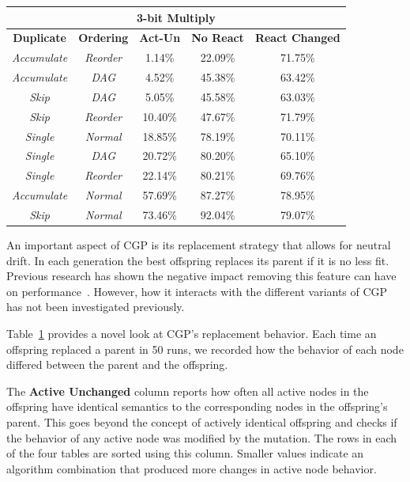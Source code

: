 \documentclass[journal]{IEEEtran}
\begin{document}
\begin{table}
\begin{tabular}{|c|c|c|c|c|}
  \multicolumn{5}{|c|}{\textbf{3-bit Multiply}} \\ \hline

\textbf{Duplicate} & \textbf{Ordering} & \textbf{Act-Un} & \textbf{No React} & \textbf{React Changed} \\ \hline
 \emph{Accumulate} & \emph{Reorder} & 1.14\% & 22.09\% & 71.75\% \\ \hline
 \emph{Accumulate} &     \emph{DAG} & 4.52\% & 45.38\% & 63.42\% \\ \hline
       \emph{Skip} &     \emph{DAG} & 5.05\% & 45.58\% & 63.03\% \\ \hline
       \emph{Skip} & \emph{Reorder} & 10.40\% & 47.67\% & 71.79\% \\ \hline
     \emph{Single} &  \emph{Normal} & 18.85\% & 78.19\% & 70.11\% \\ \hline
     \emph{Single} &     \emph{DAG} & 20.72\% & 80.20\% & 65.10\% \\ \hline
     \emph{Single} & \emph{Reorder} & 22.14\% & 80.21\% & 69.76\% \\ \hline
 \emph{Accumulate} &  \emph{Normal} & 57.69\% & 87.27\% & 78.95\% \\ \hline
   \rowcolor{Gray}
       \emph{Skip} &  \emph{Normal} & 73.46\% & 92.04\% & 79.07\% \\ \hline
	\end{tabular}
	\label{tab:reactivate}
\end{table}

An important aspect of CGP is its replacement strategy that allows for neutral drift.
In each generation the best offspring replaces its parent if it is no less fit.  Previous
research has shown the negative impact removing this feature can have on
performance~\cite{yu:2001:neutrality}. However, how it interacts with the different variants
of CGP has not been investigated previously.

Table~\ref{tab:reactivate} provides a
novel look at CGP's replacement behavior.  Each time an offspring replaced a parent
in 50 runs, we recorded how the behavior of each node differed between the
parent and the offspring.

The \textbf{Active Unchanged} column reports how often all active nodes in the offspring
have identical semantics to the corresponding nodes in the offspring's parent.
This goes beyond the concept of actively identical offspring and checks if the behavior
of any active node was modified by the mutation.  The rows in each of the four
tables are sorted using this column.  Smaller values indicate an algorithm
combination that produced more changes in active node behavior.
\end{document}
